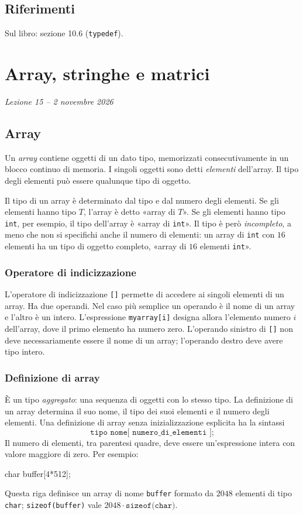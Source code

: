 \documentclass[11pt,a4paper]{article}
\begin{document}
\subsection{Riferimenti}

Sul libro: sezione 10.6 (\lstinline|typedef|).

\section[Array, stringhe e matrici (Lezione 15 -- 2 novembre 2026)]{Array, stringhe e matrici}
\noindent\emph{Lezione 15 -- 2 novembre 2026}
\subsection{Array}

Un \emph{array} contiene oggetti di un dato tipo, memorizzati consecutivamente in un blocco continuo di memoria. I singoli oggetti sono detti \emph{elementi} dell'array. Il tipo degli elementi può essere qualunque tipo di oggetto.

Il tipo di un array è determinato dal tipo e dal numero degli elementi. Se gli elementi hanno tipo $T$, l'array è detto «array di $T$». Se gli elementi hanno tipo \lstinline|int|, per esempio, il tipo dell'array è «array di \lstinline|int|». Il tipo è però \emph{incompleto}, a meno che non si specifichi anche il numero di elementi: un array di \lstinline|int| con $16$ elementi ha un tipo di oggetto completo, «array di $16$ elementi \lstinline|int|».

\subsubsection{Operatore di indicizzazione}

L'operatore di indicizzazione \lstinline|[]| permette di accedere ai singoli elementi di un array. Ha due operandi. Nel caso più semplice un operando è il nome di un array e l'altro è un intero. L'espressione \lstinline|myarray[i]| designa allora l'elemento numero $i$ dell'array, dove il primo elemento ha numero zero. L'operando sinistro di \lstinline|[]| non deve necessariamente essere il nome di un array; l'operando destro deve avere tipo intero.

\subsubsection{Definizione di array}

È un tipo \emph{aggregato}: una sequenza di oggetti con lo stesso tipo. La definizione di un array determina il suo nome, il tipo dei suoi elementi e il numero degli elementi. Una definizione di array senza inizializzazione esplicita ha la sintassi
\[
\texttt{tipo nome[ numero\_di\_elementi ];}
\]
Il numero di elementi, tra parentesi quadre, deve essere un'espressione intera con valore maggiore di zero. Per esempio:
\begin{codice}
char buffer[4*512];
\end{codice}
Questa riga definisce un array di nome \lstinline|buffer| formato da $2048$ elementi di tipo \lstinline|char|; \lstinline|sizeof(buffer)| vale $2048 \cdot \texttt{sizeof(char)}$.
\end{document}
